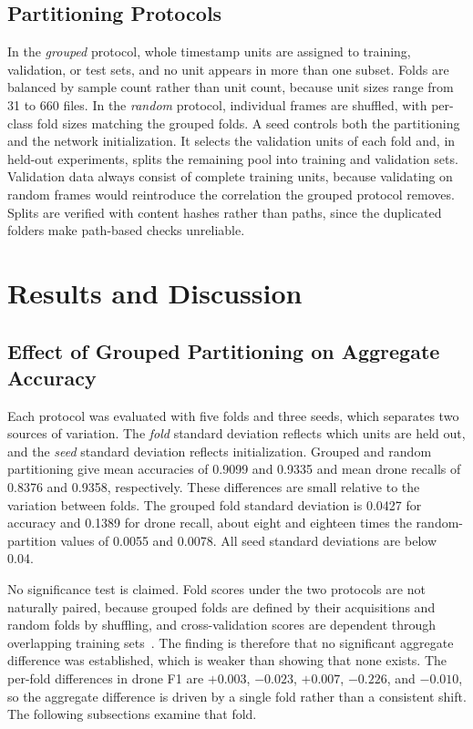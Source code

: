 \documentclass[conference]{IEEEtran}
\begin{document}
\subsection{Partitioning Protocols}

In the \emph{grouped} protocol, whole timestamp units are assigned to training, validation, or test sets, and no unit appears in more than one subset. Folds are balanced by sample count rather than unit count, because unit sizes range from 31 to 660 files. In the \emph{random} protocol, individual frames are shuffled, with per-class fold sizes matching the grouped folds. A seed controls both the partitioning and the network initialization. It selects the validation units of each fold and, in held-out experiments, splits the remaining pool into training and validation sets. Validation data always consist of complete training units, because validating on random frames would reintroduce the correlation the grouped protocol removes. Splits are verified with content hashes rather than paths, since the duplicated folders make path-based checks unreliable.

\section{Results and Discussion}
\label{sec:results}

\subsection{Effect of Grouped Partitioning on Aggregate Accuracy}
\label{sec:leak}

Each protocol was evaluated with five folds and three seeds, which separates two sources of variation. The \emph{fold} standard deviation reflects which units are held out, and the \emph{seed} standard deviation reflects initialization. Grouped and random partitioning give mean accuracies of 0.9099 and 0.9335 and mean drone recalls of 0.8376 and 0.9358, respectively. These differences are small relative to the variation between folds. The grouped fold standard deviation is 0.0427 for accuracy and 0.1389 for drone recall, about eight and eighteen times the random-partition values of 0.0055 and 0.0078. All seed standard deviations are below 0.04.

No significance test is claimed. Fold scores under the two protocols are not naturally paired, because grouped folds are defined by their acquisitions and random folds by shuffling, and cross-validation scores are dependent through overlapping training sets~\cite{dietterich1998,nadeau2003}. The finding is therefore that no significant aggregate difference was established, which is weaker than showing that none exists. The per-fold differences in drone F1 are $+0.003$, $-0.023$, $+0.007$, $-0.226$, and $-0.010$, so the aggregate difference is driven by a single fold rather than a consistent shift. The following subsections examine that fold.
\end{document}

